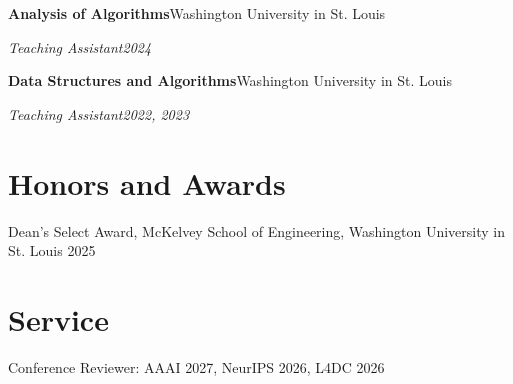 \documentclass[letterpaper,11pt]{article}
\newcommand{\cventry}[4]{%
  \vspace{2pt}
  {\textbf{#1}\hfill #2}\par
  {\emph{#3}\hfill \emph{#4}}\par
  \vspace{4pt}%
}
\newcommand{\cvline}[1]{#1\par\vspace{3pt}}
\begin{document}
\cventry{Analysis of Algorithms}{Washington University in St. Louis}
        {Teaching Assistant}{2024}

\cventry{Data Structures and Algorithms}{Washington University in St. Louis}
        {Teaching Assistant}{2022, 2023}



\section*{Honors and Awards}

\cvline{Dean's Select Award, McKelvey School of Engineering, Washington
        University in St. Louis \hfill 2025}


\section*{Service}

\cvline{Conference Reviewer: AAAI 2027, NeurIPS 2026, L4DC 2026}




\end{document}
